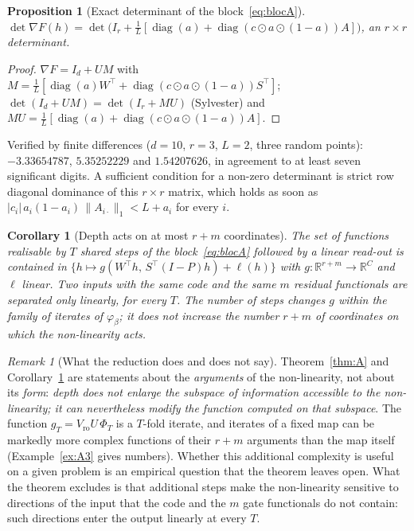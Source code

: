 \documentclass[11pt,a4paper]{article}
\theoremstyle{plain}
\newtheorem{proposition}{Proposition}
\newtheorem{corollary}{Corollary}
\theoremstyle{definition}
\theoremstyle{remark}
\newtheorem{remark}{Remark}
\newcommand{\R}{\mathbb R}
\newcommand{\diag}{\operatorname{diag}}
\newcommand{\T}{\top}
\begin{document}
\begin{proposition}[Exact determinant of the block~\eqref{eq:blocA}]
\label{prop:detA}
$\det\nabla F(h)=\det\bigl(I_r+\tfrac1L[\diag(a)+\diag(c\odot a\odot(1-a))A]\bigr)$,
an $r\times r$ determinant.
\end{proposition}
\begin{proof}
$\nabla F=I_d+UM$ with $M=\tfrac1L[\diag(a)W^\T+\diag(c\odot a\odot(1-a))S^\T]$;
$\det(I_d+UM)=\det(I_r+MU)$ (Sylvester) and
$MU=\tfrac1L[\diag(a)+\diag(c\odot a\odot(1-a))A]$.
\end{proof}
Verified by finite differences ($d=10$, $r=3$, $L=2$, three random points):
$-3.33654787$, $5.35252229$ and $1.54207626$, in agreement to at least seven
significant digits. A sufficient condition for a non-zero determinant is
strict row diagonal dominance of this $r\times r$ matrix, which holds as soon
as $|c_i|\,a_i(1-a_i)\,\|A_{i\cdot}\|_1<L+a_i$ for every $i$.

\begin{corollary}[Depth acts on at most $r+m$ coordinates]
\label{cor:A1}
The set of functions realisable by $T$ shared steps of the
block~\eqref{eq:blocA} followed by a linear read-out is contained in
$\{h\mapsto g(W^\T h,\,S^\T(I-P)h)+\ell(h)\}$ with $g:\R^{r+m}\to\R^C$ and
$\ell$ linear. Two inputs with the same code and the same $m$ residual
functionals are separated only linearly, for every $T$. The number of steps
changes $g$ within the family of iterates of $\varphi_\beta$; it does not
increase the number $r+m$ of coordinates on which the non-linearity acts.
\end{corollary}
\begin{remark}[What the reduction does and does not say]
\label{rem:depth}
Theorem~\ref{thm:A} and Corollary~\ref{cor:A1} are statements about the
\emph{arguments} of the non-linearity, not about its \emph{form}:
\emph{depth does not enlarge the subspace of information accessible to the
non-linearity; it can nevertheless modify the function computed on that
subspace}. The function $g_T=V_{\mathrm{ro}}U\,\Phi_T$ is a $T$-fold
iterate, and iterates of a fixed map can be markedly more complex functions
of their $r+m$ arguments than the map itself (Example~\ref{ex:A3} gives
numbers). Whether this additional complexity is useful on a given problem
is an empirical question that the theorem leaves open. What the theorem
excludes is that additional steps make the non-linearity sensitive to
directions of the input that the code and the $m$ gate functionals do not
contain: such directions enter the output linearly at every $T$.
\end{remark}
\end{document}
